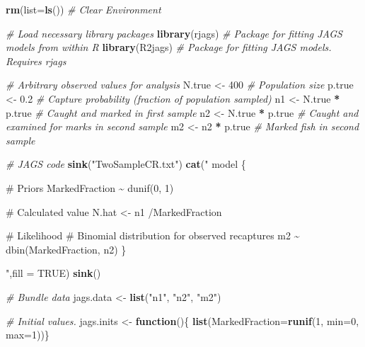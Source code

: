 \documentclass[
]{krantz}
\makeatletter
\newenvironment{Shaded}{\begin{snugshade}}{\end{snugshade}}
\newcommand{\AttributeTok}[1]{\textcolor[rgb]{0.27,0.27,0.27}{#1}}
\newcommand{\CommentTok}[1]{\textcolor[rgb]{0.37,0.37,0.37}{\textit{#1}}}
\newcommand{\ConstantTok}[1]{\textcolor[rgb]{0.37,0.37,0.37}{#1}}
\newcommand{\ControlFlowTok}[1]{\textcolor[rgb]{0.27,0.27,0.27}{\textbf{#1}}}
\newcommand{\DecValTok}[1]{\textcolor[rgb]{0.06,0.06,0.06}{#1}}
\newcommand{\FloatTok}[1]{\textcolor[rgb]{0.06,0.06,0.06}{#1}}
\newcommand{\FunctionTok}[1]{\textcolor[rgb]{0.27,0.27,0.27}{\textbf{#1}}}
\newcommand{\NormalTok}[1]{#1}
\newcommand{\OtherTok}[1]{\textcolor[rgb]{0.37,0.37,0.37}{#1}}
\newcommand{\SpecialCharTok}[1]{\textcolor[rgb]{0.43,0.43,0.43}{\textbf{#1}}}
\newcommand{\StringTok}[1]{\textcolor[rgb]{0.5,0.5,0.5}{#1}}
\newenvironment{kframe}{%
\medskip{}
\setlength{\fboxsep}{.8em}
 \def\at@end@of@kframe{}%
 \ifinner\ifhmode%
  \def\at@end@of@kframe{\end{minipage}}%
  \begin{minipage}{\columnwidth}%
 \fi\fi%
 \def\FrameCommand##1{\hskip\@totalleftmargin \hskip-\fboxsep
 \colorbox{shadecolor}{##1}\hskip-\fboxsep
     \hskip-\linewidth \hskip-\@totalleftmargin \hskip\columnwidth}%
 \MakeFramed {\advance\hsize-\width
   \@totalleftmargin\z@ \linewidth\hsize
   \@setminipage}}%
 {\par\unskip\endMakeFramed%
 \at@end@of@kframe}
\renewenvironment{Shaded}{\begin{kframe}}{\end{kframe}}
\makeatother
\begin{document}
\begin{Shaded}
\begin{Highlighting}[]
\FunctionTok{rm}\NormalTok{(}\AttributeTok{list=}\FunctionTok{ls}\NormalTok{()) }\CommentTok{\# Clear Environment}

\CommentTok{\# Load necessary library packages}
\FunctionTok{library}\NormalTok{(rjags)   }\CommentTok{\# Package for fitting JAGS models from within R}
\FunctionTok{library}\NormalTok{(R2jags)  }\CommentTok{\# Package for fitting JAGS models. Requires rjags}

\CommentTok{\# Arbitrary \textquotesingle{}observed\textquotesingle{} values for analysis}
\NormalTok{N.true }\OtherTok{\textless{}{-}} \DecValTok{400}  \CommentTok{\# Population size}
\NormalTok{p.true }\OtherTok{\textless{}{-}} \FloatTok{0.2} \CommentTok{\# Capture probability (fraction of population sampled)}
\NormalTok{n1 }\OtherTok{\textless{}{-}}\NormalTok{ N.true }\SpecialCharTok{*}\NormalTok{ p.true }\CommentTok{\# Caught and marked in first sample}
\NormalTok{n2 }\OtherTok{\textless{}{-}}\NormalTok{ N.true }\SpecialCharTok{*}\NormalTok{ p.true }\CommentTok{\# Caught and examined for marks in second sample}
\NormalTok{m2 }\OtherTok{\textless{}{-}}\NormalTok{ n2 }\SpecialCharTok{*}\NormalTok{ p.true }\CommentTok{\# Marked fish in second sample}

\CommentTok{\# JAGS code}
\FunctionTok{sink}\NormalTok{(}\StringTok{"TwoSampleCR.txt"}\NormalTok{)}
\FunctionTok{cat}\NormalTok{(}\StringTok{"}
\StringTok{    model \{}

\StringTok{    \# Priors}
\StringTok{    MarkedFraction \textasciitilde{} dunif(0, 1)}

\StringTok{    \# Calculated value}
\StringTok{    N.hat \textless{}{-} n1 /MarkedFraction}

\StringTok{    \# Likelihood}
\StringTok{    \# Binomial distribution for observed recaptures}
\StringTok{    m2 \textasciitilde{} dbin(MarkedFraction, n2)}
\StringTok{    \}}

\StringTok{    "}\NormalTok{,}\AttributeTok{fill =} \ConstantTok{TRUE}\NormalTok{)}
\FunctionTok{sink}\NormalTok{()}

\CommentTok{\# Bundle data}
\NormalTok{jags.data }\OtherTok{\textless{}{-}} \FunctionTok{list}\NormalTok{(}\StringTok{"n1"}\NormalTok{, }\StringTok{"n2"}\NormalTok{, }\StringTok{"m2"}\NormalTok{)}

\CommentTok{\# Initial values.}
\NormalTok{jags.inits }\OtherTok{\textless{}{-}} \ControlFlowTok{function}\NormalTok{()\{ }\FunctionTok{list}\NormalTok{(}\AttributeTok{MarkedFraction=}\FunctionTok{runif}\NormalTok{(}\DecValTok{1}\NormalTok{, }\AttributeTok{min=}\DecValTok{0}\NormalTok{, }\AttributeTok{max=}\DecValTok{1}\NormalTok{))\}}


\end{Highlighting}
\end{Shaded}
\end{document}
